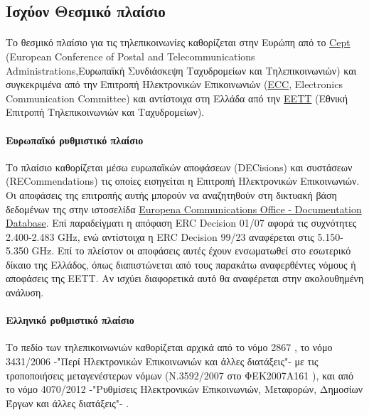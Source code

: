 \documentclass[a4paper, 12pt, twoside]{report}
\begin{document}
{{{{{{		\subsection{Ισχύον Θεσμικό πλαίσιο}
		
			\paragraph{}{Το θεσμικό πλαίσιο για τις τηλεπικοινωνίες καθορίζεται στην Ευρώπη από το \href{http://www.cept.org/cept}{Cept} (European Conference of Postal and Telecommunications Administrations,Ευρωπαϊκή
Συνδιάσκεψη Ταχυδρομείων και Τηλεπικοινωνιών) και συγκεκριμένα από την Επιτροπή Ηλεκτρονικών Επικοινωνιών (\href{http://www.cept.org/ecc}{ECC}, Electronics Communication Committee) και αντίστοιχα στη Ελλάδα από την \href{http://www.eett.gr/opencms/opencms/EETT/}{ΕΕΤΤ} (Εθνική Επιτροπή Τηλεπικοινωνιών και Ταχυδρομείων).
			}
			
			\paragraph{Ευρωπαϊκό ρυθμιστικό πλαίσιο}{Το πλαίσιο καθορίζεται μέσω ευρωπαϊκών αποφάσεων (DECisions) και συστάσεων (RECommendations) τις οποίες εισηγείται η Επιτροπή Ηλεκτρονικών Επικοινωνιών. Οι αποφάσεις της επιτροπής αυτής μπορούν να αναζητηθούν στη δικτυακή βάση δεδομένων της στην ιστοσελίδα \href{http://www.erodocdb.dk/}{Europena Communications Office - Documentation Database}. Επί παραδείγματι η απόφαση ERC Decision 01/07 αφορά τις συχνότητες 2.400-2.483 GHz, ενώ αντίστοιχα η ERC Decision 99/23 αναφέρεται στις 5.150-5.350 GHz. Επί το πλείστον οι αποφάσεις αυτές έχουν ενσωματωθεί στο εσωτερικό δίκαιο της Ελλάδος, όπως διαπιστώνεται από τους παρακάτω αναφερθέντες νόμους ή αποφάσεις της ΕΕΤΤ. Αν ισχύει διαφορετικά αυτό θα αναφέρεται στην ακολουθημένη ανάλυση.
			}
			
			\paragraph{Ελληνικό ρυθμιστικό πλαίσιο}{Το πεδίο των  τηλεπικοινωνιών καθορίζεται αρχικά από το νόμο 2867 \cite{ΦΕΚ2000A273}, το νόμο 3431/2006 -"Περί Ηλεκτρονικών Επικοινωνιών και άλλες διατάξεις"- \cite{ΦΕΚ2006A13} με τις τροποποιήσεις μεταγενέστερων νόμων (Ν.3592/2007 στο ΦΕΚ2007Α161 \cite{ΦΕΚ2007Α161}), και από το νόμο 4070/2012 -"Ρυθμίσεις Ηλεκτρονικών Επικοινωνιών, Μεταφορών, Δημοσίων Έργων και άλλες διατάξεις"- \cite{ΦΕΚ2012Α82}.
			}
}}}}}}
\end{document}
